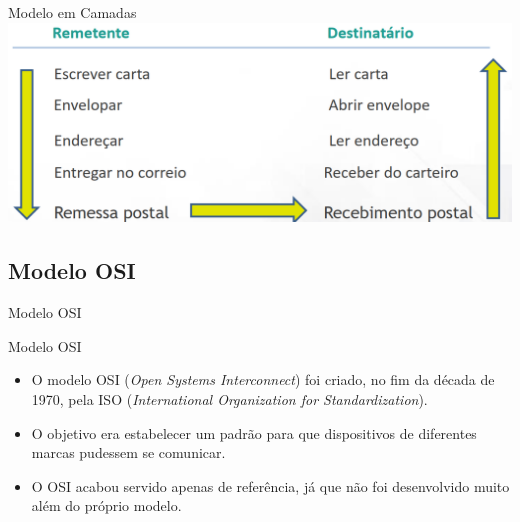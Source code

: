 \documentclass{libs/ufc_format}
\begin{document}
\begin{frame}{Modelo em Camadas}
    \centering
    \includegraphics[width=\textwidth]{media/camadas_analogia}
\end{frame}

\subsection{Modelo OSI}

\begin{frame}{}
    \centering
    \Large
    Modelo OSI
\end{frame}

\begin{frame}{Modelo OSI}
    \begin{itemize}
        \justifying
        \item O modelo OSI (\textit{Open Systems Interconnect}) foi criado, no fim da década de 1970, pela ISO (\textit{International Organization for Standardization}).
        \item O objetivo era estabelecer um padrão para que dispositivos de diferentes marcas pudessem se comunicar.
        \item O OSI acabou servido apenas de referência, já que não foi desenvolvido muito além do próprio modelo.
    \end{itemize}
\end{frame}
\end{document}
